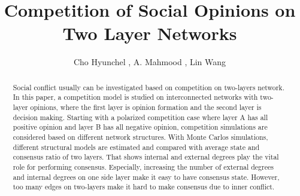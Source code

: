\documentclass[english]{cccconf}
\begin{document}
\title{Competition of Social Opinions on Two Layer Networks}


\author{Cho Hyunchel ,
        A. Mahmood ,
        Lin Wang }

\maketitle

\begin{abstract}
Social conflict usually can be investigated based on competition on two-layers network. In this paper, a competition model is studied on interconnected networks with two-layer opinions, where the first layer is opinion formation and the second layer is decision making. Starting with a polarized competition case where layer A has all positive opinion and layer B has all negative opinion, competition simulations are considered based on different network structures. With Monte Carlos simulations, different structural models are estimated and compared with average state and consensus ratio of two layers. That shows internal and external degrees play the vital role for performing consensus. Especially, increasing the number of external degrees and internal degrees on one side layer make it easy to have consensus state. However, too many edges on two-layers make it hard to make consensus due to inner conflict.
\end{abstract}


\end{document}
